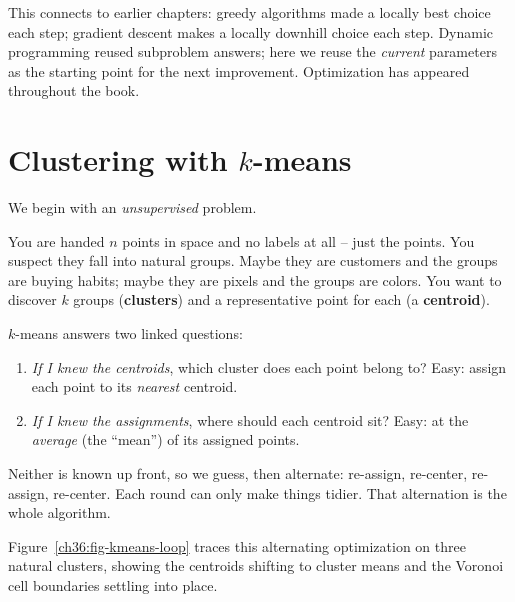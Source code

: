 This connects to earlier chapters: greedy algorithms
made a locally best choice each step; gradient descent makes a locally
downhill choice each step. Dynamic programming reused subproblem answers; here
we reuse the \emph{current} parameters as the starting point for the next
improvement. Optimization has appeared throughout the book.

\section{Clustering with $k$-means}
\label{ch36:kmeans}

We begin with an \emph{unsupervised} problem.

You are handed $n$ points in space and no labels at all -- just the points.
You suspect they fall into natural groups. Maybe they are customers and the
groups are buying habits; maybe they are pixels and the groups are colors.
You want to discover $k$ groups (\textbf{clusters}) and a representative point
for each (a \textbf{centroid}).

\begin{intuitionbox}
$k$-means answers two linked questions:
\begin{enumerate}
  \item \emph{If I knew the centroids}, which cluster does each point belong to?
        Easy: assign each point to its \emph{nearest} centroid.
  \item \emph{If I knew the assignments}, where should each centroid sit?
        Easy: at the \emph{average} (the ``mean'') of its assigned points.
\end{enumerate}
Neither is known up front, so we guess, then alternate: re-assign, re-center,
re-assign, re-center. Each round can only make things tidier. That alternation
is the whole algorithm.
\end{intuitionbox}

Figure~\ref{ch36:fig-kmeans-loop} traces this alternating optimization on three
natural clusters, showing the centroids shifting to cluster means and the Voronoi
cell boundaries settling into place.

